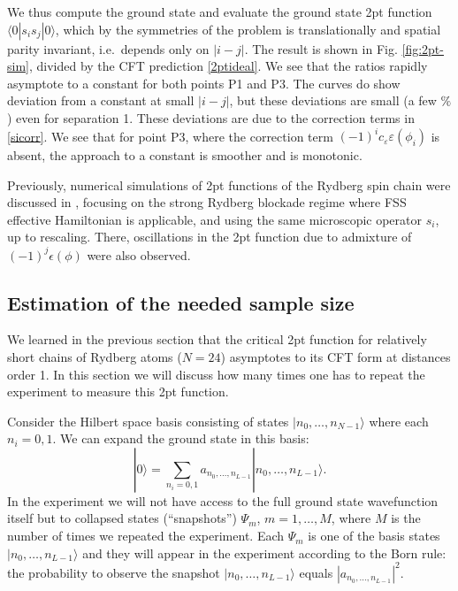 \documentclass[a4paper,11pt]{article}
\theoremstyle{remark}
\theoremstyle{theorem}
\begin{document}
We thus compute the ground state and evaluate the ground state 2pt function $\langle 0| s_i s_j |0 \rangle$, which by the
symmetries of the problem is translationally and spatial parity invariant,
i.e.~depends only on $| i - j |$. The result is shown in Fig.
\ref{fig:2pt-sim}, divided by the CFT prediction \eqref{2ptideal}. We see that
the ratios rapidly asymptote to a constant for both points P1 and P3. The
curves do show deviation from a constant at small $| i - j |$, but these deviations are small (a few $\%$) even for separation 1. These
deviations are due to the correction terms in \eqref{sicorr}. We see that for
point P3, where the correction term $(- 1)^i c_{\varepsilon} \varepsilon
(\phi_i)$ is absent, the approach to a constant is smoother and is monotonic.


Previously, numerical simulations of 2pt functions of the Rydberg spin chain
were discussed in {\cite{Slagle:2021ene}}, focusing on the strong Rydberg
blockade regime where FSS effective Hamiltonian is applicable, and using the
same microscopic operator $s_i$, up to rescaling. There, oscillations in the
2pt function due to admixture of $(- 1)^j \epsilon (\phi)$ were also observed.

\subsection{Estimation of the needed sample size}\label{sec:estimation-of-the-needed-sample-size}

\label{sec:sample}We learned in the previous section that the critical 2pt
function for relatively short chains of Rydberg atoms ($N = 24$) asymptotes to
its CFT form at distances order 1. In this section we will discuss how many
times one has to repeat the experiment to measure this 2pt function.

Consider the Hilbert space basis consisting of states $|n_0, \ldots, n_{N - 1}
\rangle$ where each $n_i = 0, 1$. We can expand the ground state in this
basis:
\begin{equation}
	| 0 \rangle = \sum_{n_i = 0, 1} a_{n_0, \ldots, n_{L - 1}} |n_0, \ldots,
	n_{L - 1} \rangle .
\end{equation}
In the experiment we will not have access to the full ground state
wavefunction itself but to collapsed states (``snapshots'') $\Psi_m$, $m = 1,
\ldots, M$, where $M$ is the number of times we repeated the experiment. Each
$\Psi_m$ is one of the basis states $|n_0, \ldots, n_{L - 1} \rangle$ and they
will appear in the experiment according to the Born rule: the probability to
observe the snapshot $|n_0, \ldots, n_{L - 1} \rangle$ equals $|a_{n_0,
	\ldots, n_{L - 1}} |^2$.
\end{document}
